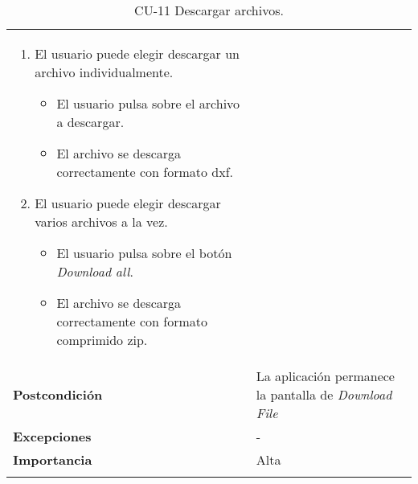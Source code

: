 \begin{longtable}[H]{@{}ll@{}}
\begin{minipage}[t]{0.71\columnwidth}
\begin{enumerate}
\def\labelenumi{\arabic{enumi}.}
\tightlist
\item
  El usuario puede elegir descargar un archivo individualmente.
\begin{itemize}
\tightlist
\item
  El usuario pulsa sobre el archivo a descargar. 
\item
  El archivo se descarga correctamente con formato dxf.
\end{itemize}
\item
  El usuario puede elegir descargar varios archivos a la vez.
\begin{itemize}
\tightlist
\item
  El usuario pulsa sobre el botón \emph{Download all}. 
\item
  El archivo se descarga correctamente con formato comprimido zip.
\end{itemize}
\end{enumerate}\strut
\end{minipage}\tabularnewline
\begin{minipage}[t]{0.23\columnwidth}\raggedright\strut
\textbf{Postcondición}\strut
\end{minipage} & \begin{minipage}[t]{0.71\columnwidth}\raggedright\strut
La aplicación permanece la pantalla de \emph{Download File}
\end{minipage}\tabularnewline
\begin{minipage}[t]{0.23\columnwidth}\raggedright\strut
\textbf{Excepciones}\strut
\end{minipage} & \begin{minipage}[t]{0.71\columnwidth}\raggedright\strut
-\strut
\end{minipage}\tabularnewline
\begin{minipage}[t]{0.23\columnwidth}\raggedright\strut
\textbf{Importancia}\strut
\end{minipage} & \begin{minipage}[t]{0.71\columnwidth}\raggedright\strut
Alta\strut
\end{minipage}\tabularnewline
\bottomrule
\caption{CU-11 Descargar archivos.}
\end{longtable}

\newpage



